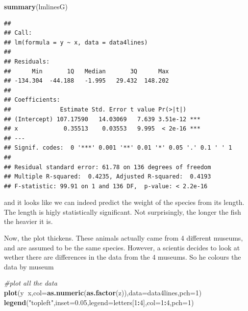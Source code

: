\documentclass[
]{book}
\newenvironment{Shaded}{\begin{snugshade}}{\end{snugshade}}
\newcommand{\CommentTok}[1]{\textcolor[rgb]{0.56,0.35,0.01}{\textit{#1}}}
\newcommand{\DataTypeTok}[1]{\textcolor[rgb]{0.13,0.29,0.53}{#1}}
\newcommand{\DecValTok}[1]{\textcolor[rgb]{0.00,0.00,0.81}{#1}}
\newcommand{\FloatTok}[1]{\textcolor[rgb]{0.00,0.00,0.81}{#1}}
\newcommand{\KeywordTok}[1]{\textcolor[rgb]{0.13,0.29,0.53}{\textbf{#1}}}
\newcommand{\NormalTok}[1]{#1}
\newcommand{\OperatorTok}[1]{\textcolor[rgb]{0.81,0.36,0.00}{\textbf{#1}}}
\newcommand{\StringTok}[1]{\textcolor[rgb]{0.31,0.60,0.02}{#1}}
\begin{document}
\begin{Shaded}
\begin{Highlighting}[]
\KeywordTok{summary}\NormalTok{(lmlinesG)}
\end{Highlighting}
\end{Shaded}

\begin{verbatim}
## 
## Call:
## lm(formula = y ~ x, data = data4lines)
## 
## Residuals:
##      Min       1Q   Median       3Q      Max 
## -134.304  -44.188   -1.995   29.432  148.202 
## 
## Coefficients:
##              Estimate Std. Error t value Pr(>|t|)    
## (Intercept) 107.17590   14.03069   7.639 3.51e-12 ***
## x             0.35513    0.03553   9.995  < 2e-16 ***
## ---
## Signif. codes:  0 '***' 0.001 '**' 0.01 '*' 0.05 '.' 0.1 ' ' 1
## 
## Residual standard error: 61.78 on 136 degrees of freedom
## Multiple R-squared:  0.4235,	Adjusted R-squared:  0.4193 
## F-statistic: 99.91 on 1 and 136 DF,  p-value: < 2.2e-16
\end{verbatim}

and it looks like we can indeed predict the weight of the species from its length. The length is higly statistically significant. Not surprisingly, the longer the fish the heavier it is.

Now, the plot thickens. These animals actually came from 4 different museums, and are assumed to be the same species. However, a scientis decides to look at wether there are differences in the data from the 4 museums. So he colours the data by museum

\begin{Shaded}
\begin{Highlighting}[]
\CommentTok{#plot all the data}
\KeywordTok{plot}\NormalTok{(y}\OperatorTok{~}\NormalTok{x,}\DataTypeTok{col=}\KeywordTok{as.numeric}\NormalTok{(}\KeywordTok{as.factor}\NormalTok{(z)),}\DataTypeTok{data=}\NormalTok{data4lines,}\DataTypeTok{pch=}\DecValTok{1}\NormalTok{)}
\KeywordTok{legend}\NormalTok{(}\StringTok{"topleft"}\NormalTok{,}\DataTypeTok{inset=}\FloatTok{0.05}\NormalTok{,}\DataTypeTok{legend=}\NormalTok{letters[}\DecValTok{1}\OperatorTok{:}\DecValTok{4}\NormalTok{],}\DataTypeTok{col=}\DecValTok{1}\OperatorTok{:}\DecValTok{4}\NormalTok{,}\DataTypeTok{pch=}\DecValTok{1}\NormalTok{)}
\end{Highlighting}
\end{Shaded}
\end{document}
